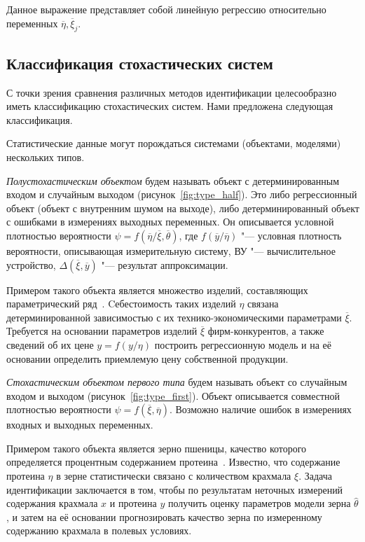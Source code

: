 Данное выражение представляет собой линейную регрессию относительно переменных
\( \overline{\eta}, \overline{\xi}_j \).

\subsection{Классификация стохастических систем}\label{subsec:classification}

С точки зрения сравнения различных методов идентификации целесообразно
иметь классификацию стохастических систем.
Нами предложена следующая классификация.

Статистические данные могут порождаться системами (объектами, моделями) нескольких типов.

\emph{Полустохастическим объектом} будем называть объект с детерминированным входом и
случайным выходом (рисунок~\ref{fig:type_half}).
Это либо регрессионный объект (объект с внутренним шумом на выходе),
либо детерминированный объект с ошибками в измерениях выходных переменных.
Он описывается условной плотностью вероятности
\( \psi = f(\overline{\eta} / \overline{\xi}, \overline{\theta}) \),
где \( f(\overline{y} / \overline{\eta}) \)
"--- условная плотность вероятности, описывающая измерительную систему,
ВУ "--- вычислительное устройство,
\( \Delta(\overline{\xi}, \overline{y}) \) "--- результат аппроксимации.

Примером такого объекта является множество изделий, составляющих параметрический ряд~\cite{kruchkova02}.
Cебестоимость таких изделий \( \eta \) связана детерминированной зависимостью с
их технико-экономическими параметрами \( \overline{\xi} \).
Требуется на основании параметров изделий \( \overline{\xi} \) фирм-конкурентов,
а также сведений об их цене \( y = f(y / \eta) \) построить регрессионную модель и на её основании
определить приемлемую цену собственной продукции.

\emph{Стохастическим объектом первого типа} будем называть объект со случайным входом и выходом
(рисунок~\ref{fig:type_first}).
Объект описывается совместной плотностью вероятности \( \psi = f(\overline{\xi}, \overline{\eta}) \).
Возможно наличие ошибок в измерениях входных и выходных переменных.

Примером такого объекта является зерно пшеницы,
качество которого определяется процентным содержанием протеина~\cite{ezekiel41}.
Известно, что содержание протеина \( \eta \) в зерне статистически связано с
количеством крахмала \( \xi \).
Задача идентификации заключается в том, чтобы по результатам неточных измерений содержания
крахмала \( x \) и протеина \( y \) получить оценку параметров модели зерна \( \hat{\theta} \),
и затем на её основании прогнозировать качество зерна по измеренному содержанию крахмала в
полевых условиях.

